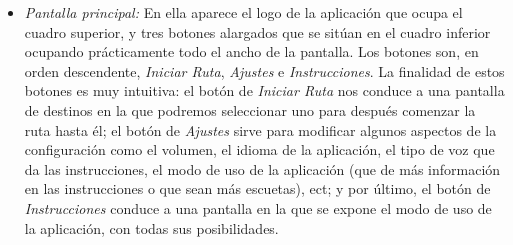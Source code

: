 \begin{itemize}
	\item \textit{Pantalla principal:} En ella aparece el logo de la aplicación que ocupa el cuadro superior, y tres botones alargados que se sitúan en el cuadro inferior ocupando prácticamente todo el ancho de la pantalla. Los botones son, en orden descendente, \textit{Iniciar Ruta}, \textit{Ajustes} e \textit{Instrucciones}. La finalidad de estos botones es muy intuitiva: el botón de \textit{Iniciar Ruta} nos conduce a una pantalla de destinos en la que podremos seleccionar uno para después comenzar la ruta hasta él; el botón de \textit{Ajustes} sirve para modificar algunos aspectos de la configuración como el volumen, el idioma de la aplicación, el tipo de voz que da las instrucciones, el modo de uso de la aplicación (que de más información en las instrucciones o que sean más escuetas), ect; y por último, el botón de \textit{Instrucciones} conduce a una pantalla en la que se expone el modo de uso de la aplicación, con todas sus posibilidades.
	

\end{itemize}
